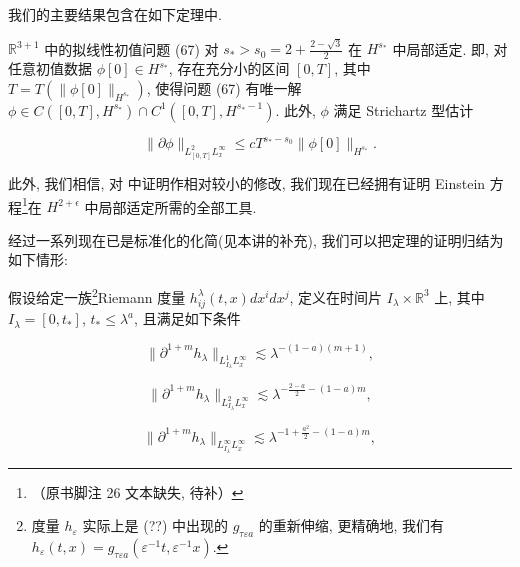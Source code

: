 我们的主要结果包含在如下定理中. 

\begin{theorem}\label{thm:cG-3.10}
$\mathbb{R}^{3 + 1}$ 中的拟线性初值问题 (67) 对 $s_* > s_0 = 2 + \frac{2 - \sqrt{3}}{2}$ 在 $H^{s_*}$ 中局部适定. 即, 对任意初值数据 $\phi[0] \in H^{s_*}$, 存在充分小的区间 $[0,  T]$, 其中 $T = T(\|\phi[0]\|_{H^{s_*}})$, 使得问题 (67) 有唯一解 $\phi \in C([0,  T],  H^{s_*}) \cap C^1([0,  T],  H^{s_* - 1})$. 此外, $\phi$ 满足 Strichartz 型估计

\begin{equation}
\| \partial \phi \| _ {L _ {[ 0,  T ]} ^ {2} L _ {x} ^ {\infty}} \leq c T ^ {s _ {*} - s _ {0}} \| \phi [ 0 ] \| _ {H ^ {s _ {*}}}.\label{eq:cG-71}
\end{equation}

此外, 我们相信, 对 \cite{gfref42} 中证明作相对较小的修改, 我们现在已经拥有证明 Einstein 方程\footnote{（原书脚注 26 文本缺失, 待补）}在 $H^{2+\epsilon}$ 中局部适定所需的全部工具. 
\end{theorem}


经过一系列现在已是标准化的化简(见本讲的补充), 我们可以把定理的证明归结为如下情形:

假设给定一族\footnote{度量 $h_\varepsilon$ 实际上是 (??) 中出现的 $g_{\tau\varepsilon a}$ 的重新伸缩, 更精确地, 我们有 $h_\varepsilon(t, x)=g_{\tau\varepsilon a}(\varepsilon^{-1}t, \varepsilon^{-1}x)$.}Riemann 度量 $h_{ij}^{\lambda}(t, x)dx^{i}dx^{j}$, 定义在时间片 $I_{\lambda}\times\mathbb{R}^{3}$ 上, 其中 $I_{\lambda}=[0, t_{*}]$, $t_{*}\leq\lambda^{a}$, 且满足如下条件

\begin{equation}
\| \partial^ {1 + m} h _ {\lambda} \| _ {L _ {I _ {\lambda}} ^ {1} L _ {x} ^ {\infty}} \lesssim \lambda^ {- (1 - a) (m + 1)}, \label{eq:cG-72}
\end{equation}

\begin{equation}
\| \partial^ {1 + m} h _ {\lambda} \| _ {L _ {I _ {\lambda}} ^ {2} L _ {x} ^ {\infty}} \lesssim \lambda^ {- \frac {2 - a}{2} - (1 - a) m}, \label{eq:cG-73}
\end{equation}

\begin{equation}
\| \partial^ {1 + m} h _ {\lambda} \| _ {L _ {I _ {\lambda}} ^ {\infty} L _ {x} ^ {\infty}} \lesssim \lambda^ {- 1 + \frac {a ^ {2}}{2} - (1 - a) m}, \label{eq:cG-74}
\end{equation}

